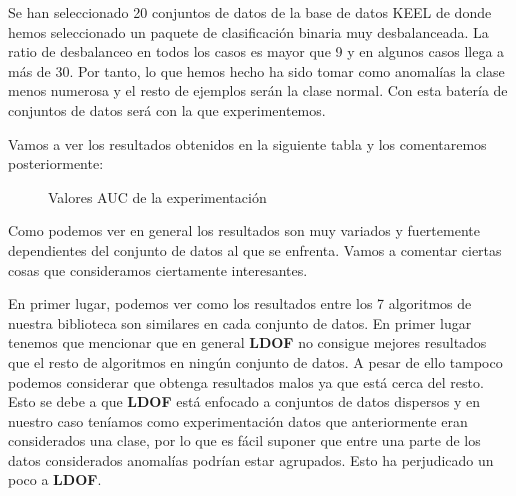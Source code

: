 Se han seleccionado 20 conjuntos de datos de la base de datos KEEL \cite{alcala-fdezKEELSoftwareTool2009} 
de donde hemos seleccionado un paquete de clasificación binaria muy desbalanceada. La ratio de  
desbalanceo en todos los casos es mayor que 9 y en algunos casos llega a más de 30. Por tanto, 
lo que hemos hecho ha sido tomar como anomalías la clase menos numerosa y el resto de ejemplos 
serán la clase normal. Con esta batería de conjuntos de datos será con la que experimentemos. 

Vamos a ver los resultados obtenidos en la siguiente tabla y los comentaremos posteriormente:

\begin{figure}[h]
  \caption{\label{fig:resultados} Valores AUC de la experimentación}
\end{figure}

Como podemos ver en general los resultados son muy variados y fuertemente dependientes del conjunto
de datos al que se enfrenta. Vamos a comentar ciertas cosas que consideramos ciertamente 
interesantes.

En primer lugar, podemos ver como los resultados entre los 7 algoritmos de nuestra biblioteca
 son similares en cada conjunto de 
datos. En primer lugar tenemos que mencionar que en general \textbf{LDOF} no consigue mejores  
resultados que el resto de algoritmos en ningún conjunto de datos. A pesar de ello tampoco podemos 
considerar que obtenga resultados malos ya que está cerca del resto. Esto se debe a que  
\textbf{LDOF} está enfocado a conjuntos de datos dispersos y en nuestro caso teníamos como 
experimentación datos que anteriormente eran considerados una clase, por lo que es fácil suponer 
que entre una parte de los datos considerados anomalías podrían estar agrupados. Esto ha perjudicado 
un poco a \textbf{LDOF}. 

